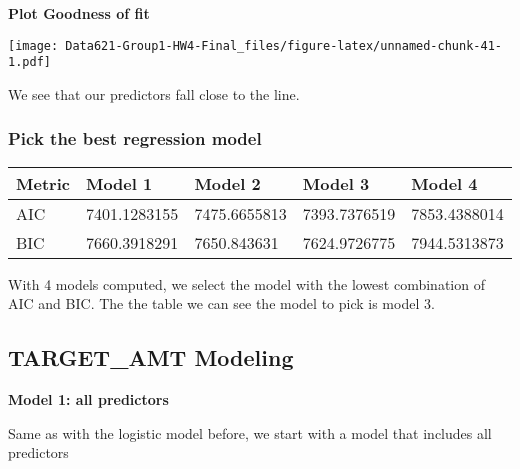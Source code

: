 \documentclass[]{article}
\begin{document}
\textbf{Plot Goodness of fit}

\texttt{[image: Data621-Group1-HW4-Final\_files/figure-latex/unnamed-chunk-41-1.pdf]}

We see that our predictors fall close to the line.

\hypertarget{pick-the-best-regression-model}{%
\subsubsection{Pick the best regression
model}\label{pick-the-best-regression-model}}

\begin{longtable}[]{@{}lllll@{}}
\toprule
Metric & Model 1 & Model 2 & Model 3 & Model 4\tabularnewline
\midrule
\endhead
AIC & 7401.1283155 & 7475.6655813 & 7393.7376519 &
7853.4388014\tabularnewline
BIC & 7660.3918291 & 7650.843631 & 7624.9726775 &
7944.5313873\tabularnewline
\bottomrule
\end{longtable}

With 4 models computed, we select the model with the lowest combination
of AIC and BIC. The the table we can see the model to pick is model 3.

\hypertarget{target_amt-modeling}{%
\subsection{TARGET\_AMT Modeling}\label{target_amt-modeling}}

\textbf{Model 1: all predictors}

Same as with the logistic model before, we start with a model that
includes all predictors
\end{document}
